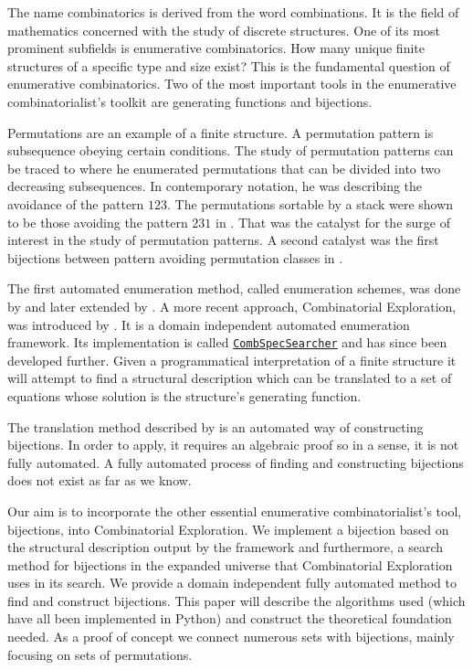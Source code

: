 \label{ch:introduction}
The name combinatorics is derived from the word combinations. It is the field of mathematics concerned with the study of discrete structures. One of its most prominent subfields is enumerative combinatorics. How many unique finite structures of a specific type and size exist? This is the fundamental question of enumerative combinatorics. Two of the most important tools in the enumerative combinatorialist's toolkit are generating functions and bijections.

Permutations are an example of a finite structure. A permutation pattern is subsequence obeying certain conditions. The study of permutation patterns can be traced to  where he enumerated permutations that can be divided into two decreasing subsequences. In contemporary notation, he was describing the avoidance of the pattern $123$. The permutations sortable by a stack were shown to be those avoiding the pattern $231$ in . That was the catalyst for the surge of interest in the study of permutation patterns. A second catalyst was the first bijections between pattern avoiding permutation classes in . 

The first automated enumeration method, called enumeration schemes, was done by  and later extended by . A more recent approach, Combinatorial Exploration, was introduced by . It is a domain independent automated enumeration framework. Its implementation is called \href{https://github.com/PermutaTriangle/comb_spec_searcher}{\texttt{CombSpecSearcher}} and has since been developed further. Given a programmatical interpretation of a finite structure it will attempt to find a structural description which can be translated to a set of equations whose solution is the structure's generating function.

The translation method described by  is an automated way of constructing bijections. In order to apply, it requires an algebraic proof so in a sense, it is not fully automated. A fully automated process of finding and constructing bijections does not exist as far as we know.

Our aim is to incorporate the other essential enumerative combinatorialist's tool, bijections, into Combinatorial Exploration. We implement a bijection based on the structural description output by the framework and furthermore, a search method for bijections in the expanded universe that Combinatorial Exploration uses in its search. We provide a domain independent fully automated method to find and construct bijections. This paper will describe the algorithms used (which have all been implemented in Python) and construct the theoretical foundation needed. As a proof of concept we connect numerous sets with bijections, mainly focusing on sets of permutations.

